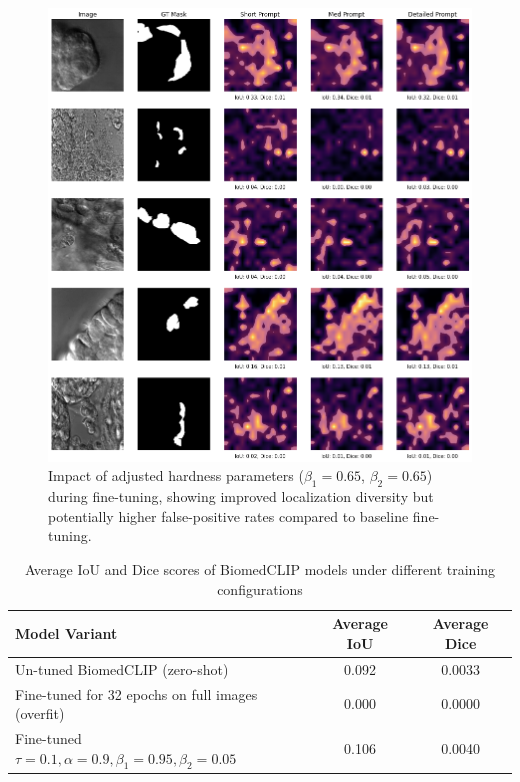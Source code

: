 \documentclass[./dissertation.tex]{subfiles}
\begin{document}
\begin{figure}
    \centering
    \includegraphics[width=\textwidth]{figures/sam/fine-tuned masks long captions small train 01 09 095 005.png} %
    \caption{Impact of adjusted hardness parameters (\(\beta_1=0.65\), \(\beta_2=0.65\)) during fine-tuning, showing improved localization diversity but potentially higher false-positive rates compared to baseline fine-tuning.}
    \label{fig:fine_tuned_masks_small_train_01_09_095_005} %
\end{figure}

\begin{table}[ht]
    \centering
    \caption{Average IoU and Dice scores of BiomedCLIP models under different training configurations}
    \label{tab:biomedclip_performance}
    \renewcommand{\arraystretch}{1.2}
    \begin{tabular}{|l|c|c|}
        \hline
        \textbf{Model Variant}                                          & \textbf{Average IoU} & \textbf{Average Dice} \\ \hline
        Un-tuned BiomedCLIP (zero-shot)                                 & 0.092                & 0.0033                \\ \hline
        Fine-tuned for 32 epochs on full images (overfit)               & 0.000                & 0.0000                \\ \hline
        Fine-tuned \(\tau=0.1, \alpha=0.9, \beta_1=0.95, \beta_2=0.05\) & 0.106                & 0.0040                \\ \hline
    \end{tabular}
\end{table}
\end{document}

